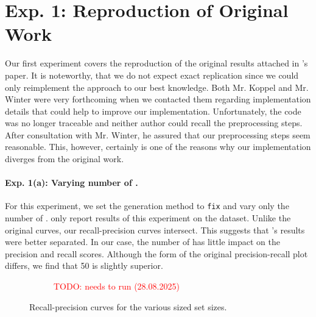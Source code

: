 
\section{Exp. 1: Reproduction of Original Work}

Our first experiment covers the reproduction of the original results attached in \citet{koppel_determining_2014}'s paper.
It is noteworthy, that we do not expect exact replication since we could only reimplement the approach to our best knowledge.
Both Mr. Koppel and Mr. Winter were very forthcoming when we contacted them regarding implementation details that could help to improve our implementation.
Unfortunately, the code was no longer traceable and neither author could recall the preprocessing steps.
After consultation with Mr. Winter, he assured that our preprocessing steps seem reasonable.
This, however, certainly is one of the reasons why our implementation diverges from the original work.

\paragraph{Exp. 1(a): Varying number of \imps{}.}

For this experiment, we set the \imp{} generation method to \texttt{fix} and vary only the number of \imps{}.
\citet{koppel_determining_2014} only report results of this experiment on the \dataBlog{} dataset.
Unlike the original curves, our \impAppr{} recall-precision curves intersect.
This suggests that \citet{koppel_determining_2014}'s results were better separated.
In our case, the number of \imps{} has little impact on the precision and recall scores.
Although the form of the original precision-recall plot differs, we find that 50 \imps{} is slightly superior.

\begin{figure}[htbp]
  \centering
  \begin{subfigure}[b]{0.48\textwidth}
    \centering
    
    \caption{\dataBlog{} \textcolor{red}{TODO: needs to run (28.08.2025)}}
    \label{fig:blog_dif_n}
  \end{subfigure}
  \hfill
  \begin{subfigure}[b]{0.48\textwidth}
    \centering
    
    \caption{\dataStudent{}}
    \label{fig:student_essays_dif_n}
  \end{subfigure}
  \caption{Recall-precision curves for the various sized \imp{} set sizes.}
  \label{fig:repr_diff_n_imps_fixed}
\end{figure}


